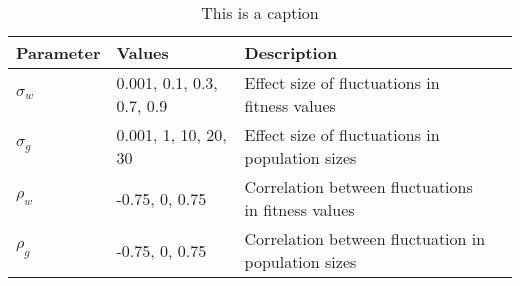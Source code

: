 \documentclass[]{article}
\begin{document}
\begin{table}[h]
\fontsize{10}{18}\selectfont
\centering
\begin{tabular}{@{}llll@{}}
\toprule
Parameter                    & Values                    & Description                                   &  \\ \midrule
$\sigma_{w}$ & 0.001, 0.1, 0.3, 0.7, 0.9 & Effect size of fluctuations in fitness values &  \\
$\sigma_{g}$ & 0.001, 1, 10, 20, 30  & Effect size of fluctuations in population sizes                                              &  \\
$\rho_{w}$  &  -0.75, 0, 0.75                         &   Correlation between fluctuations in fitness values                                            &  \\
$\rho_{g}$  &   -0.75, 0, 0.75                        &  Correlation between fluctuation in population sizes                                             &  \\ \bottomrule
\end{tabular}
\caption{This is a caption}
\label{tab:fluctuations}
\end{table}





\clearpage


\end{document}
